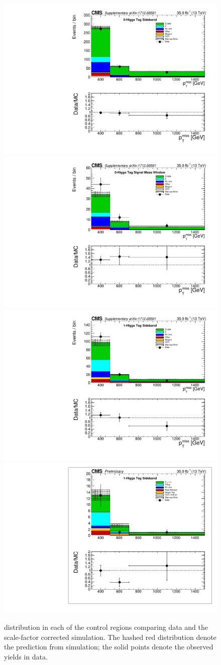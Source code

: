 \begin{figure}[hbp!]
\centering
\includegraphics[trim={5px 5px 5px 5px},clip,width=0.45\linewidth]{figs/SUS17006/Unblinding_antitagSB.pdf}
\includegraphics[trim={5px 5px 5px 5px},clip,width=0.45\linewidth]{figs/SUS17006/Unblinding_antitagSR.pdf}\\
\includegraphics[trim={5px 5px 5px 5px},clip,width=0.45\linewidth]{figs/SUS17006/Unblinding_tagSB.pdf}
\includegraphics[trim={5px 5px 5px 5px},clip,width=0.45\linewidth]{figs/SUS17006/Unblinding_doubletagSB.pdf}\\
\caption{\ptmiss distribution in each of the control regions comparing data and the scale-factor corrected simulation.  The hashed red distribution denote the prediction from simulation; the solid points denote the observed yields in data.}
\label{fig:UnblindCR}
\end{figure}

